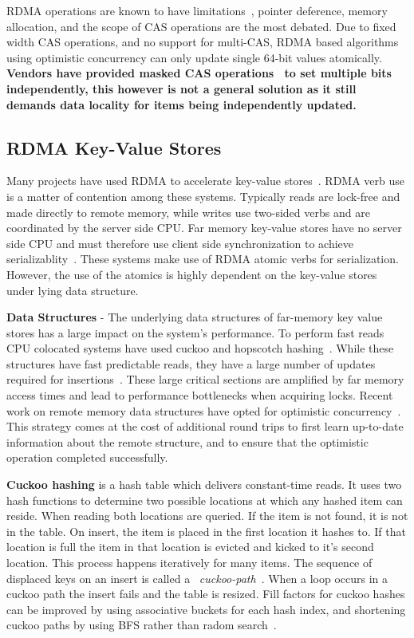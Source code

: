 RDMA operations are known to have limitations~\cite{prism},
pointer deference, memory allocation, and the scope of CAS
operations are the most debated. Due to fixed width CAS
operations, and no support for multi-CAS, RDMA based
algorithms using optimistic concurrency can only update
single 64-bit values atomically. \textbf{Vendors have provided
masked CAS operations~\cite{rdma-masked-cas} to set multiple
bits independently, this however is not a general solution
as it still demands data locality for items being
independently updated.}


\subsection{RDMA Key-Value Stores}

Many projects have used RDMA to accelerate key-value
stores~\cite{farm,erpc,herd,mica,pilaf,cell,faast,storm,memc3}.
RDMA verb use is a matter of contention among these systems.
Typically reads are lock-free and made directly to remote
memory, while writes use two-sided verbs and are coordinated
by the server side CPU.
Far memory key-value stores have no server side CPU and must
therefore use client side synchronization to achieve
serializablity~\cite{rolex,fusee,clover,sherman,ford,race}.
These systems make use of RDMA atomic verbs for
serialization. However, the use of the atomics is highly
dependent on the key-value stores under lying data
structure.

\textbf{Data Structures} - The underlying data structures of
far-memory key value stores has a large impact on the
system's performance. To perform fast reads CPU colocated
systems have used cuckoo and hopscotch
hashing~\cite{pilaf,herd,cuckoo,hopscotch}. While these
structures have fast predictable reads, they have a large
number of updates required for
insertions~\cite{pilaf,cuckoo-improvements,memc3}. These
large critical sections are amplified by far memory access
times and lead to performance bottlenecks when acquiring
locks. Recent work on remote memory data structures have
opted for optimistic concurrency~\cite{clover,race,ford}.
This strategy comes at the cost of additional round trips to
first learn up-to-date information about the remote
structure, and to ensure that the optimistic operation
completed successfully.

\textbf{Cuckoo hashing} is a hash table which delivers constant-time reads. It uses two hash functions to determine two
possible locations at which any hashed item can reside. When
reading both locations are queried. If the item is not
found, it is not in the table. On insert, the item is placed
in the first location it hashes to. If that location is full
the item in that location is evicted and kicked to it's
second location.  This process happens iteratively for many
items. The sequence of displaced keys on an insert is called
a ~\textit{cuckoo-path}~\cite{cuckoo-improvements}. When a
loop occurs in a cuckoo path the insert fails and the table
is resized. Fill factors for cuckoo hashes can be improved
by using associative buckets for each hash index, and
shortening cuckoo paths by using BFS rather than radom
search~\cite{cuckoo-improvements}.

